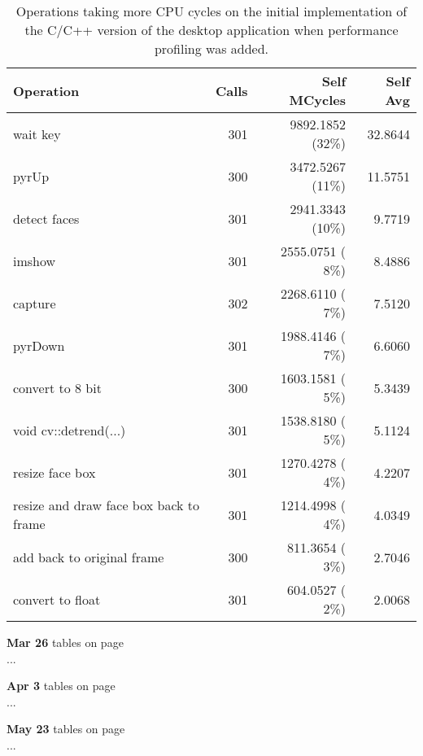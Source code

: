 \begin{description}
        \begin{table}[h]
          \centering
          \begin{tabular}{|l|r|r|r|}
            \hline
            Operation & Calls & Self MCycles & Self Avg \\
            \hline
            wait key                                & 301 & 9892.1852 (32\%) & 32.8644 \\
            pyrUp                                   & 300 & 3472.5267 (11\%) & 11.5751 \\
            detect faces                            & 301 & 2941.3343 (10\%) & 9.7719  \\
            imshow                                  & 301 & 2555.0751 ( 8\%) & 8.4886  \\
            capture                                 & 302 & 2268.6110 ( 7\%) & 7.5120  \\
            pyrDown                                 & 301 & 1988.4146 ( 7\%) & 6.6060  \\
            convert to 8 bit                        & 300 & 1603.1581 ( 5\%) & 5.3439  \\
            void cv::detrend(...)                   & 301 & 1538.8180 ( 5\%) & 5.1124  \\
            resize face box                         & 301 & 1270.4278 ( 4\%) & 4.2207  \\
            resize and draw face box back to frame  & 301 & 1214.4998 ( 4\%) & 4.0349  \\
            add back to original frame              & 300 & 811.3654  ( 3\%) & 2.7046  \\
            convert to float                        & 301 & 604.0527  ( 2\%) & 2.0068  \\
            \hline
          \end{tabular}
          \caption{
            Operations taking more CPU cycles on the initial implementation of
            the C/C++ version of the desktop application when performance
            profiling was added.
          }
          \label{tab:profile:1}
        \end{table}

  \item \textbf{Mar 26} tables on page~\pageref{pdf:profile:2}\hfill\\
        ...

  \item \textbf{Apr 3} tables on page~\pageref{pdf:profile:3}\hfill\\
        ...

  \item \textbf{May 23} tables on page~\pageref{pdf:profile:4}\hfill\\
        ...
\end{description}

